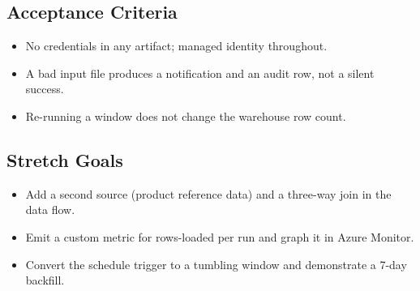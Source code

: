 \subsection*{Acceptance Criteria}
\begin{itemize}
    \item No credentials in any artifact; managed identity throughout.
    \item A bad input file produces a notification and an audit row, not a silent success.
    \item Re-running a window does not change the warehouse row count.
\end{itemize}

\subsection*{Stretch Goals}
\begin{itemize}
    \item Add a second source (product reference data) and a three-way join in the data flow.
    \item Emit a custom metric for rows-loaded per run and graph it in Azure Monitor.
    \item Convert the schedule trigger to a tumbling window and demonstrate a 7-day backfill.
\end{itemize}
